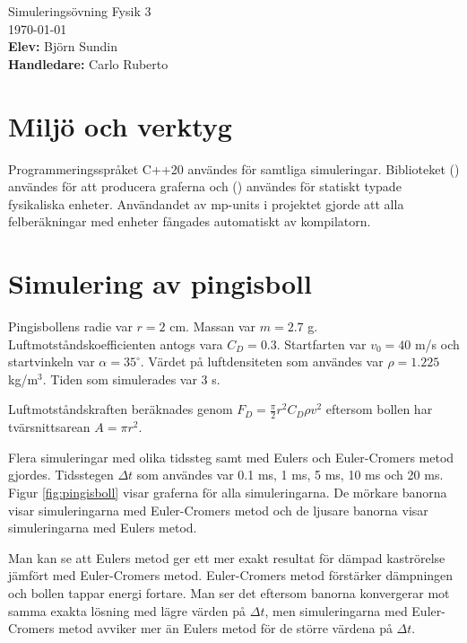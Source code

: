\documentclass[12pt, a4paper]{article}
\begin{document}
\begin{titlepage}
    \begin{center}
        \Huge{Simuleringsövning Fysik 3}\bigskip \\
        \LARGE \today\vspace{1cm}\\
        \large {}
        \textbf{Elev:} Björn Sundin\\
        \textbf{Handledare:} Carlo Ruberto
    \end{center}
\end{titlepage}

\section{Miljö och verktyg}
Programmeringsspråket C++20 användes för samtliga simuleringar. Biblioteket  (\cite{matplotplusplus}) användes för att producera graferna och  (\cite{mp-units}) användes för statiskt typade fysikaliska enheter. Användandet av mp-units i projektet gjorde att alla felberäkningar med enheter fångades automatiskt av kompilatorn.

\section{Simulering av pingisboll}
Pingisbollens radie var $r=2$ cm. Massan var $m=2.7$ g. Luftmotstånds\-koefficienten antogs vara $C_D=0.3$. Startfarten var $v_0=40$ m/s och startvinkeln var $\alpha=35^\circ$. Värdet på luftdensiteten som användes var $\rho=1.225$ kg/m$^3$. Tiden som simulerades var 3 s.

Luftmotståndskraften beräknades genom $F_D=\frac{\pi}{2}r^2C_D\rho v^2$ eftersom bollen har tvärsnittsarean $A=\pi r^2$.

Flera simuleringar med olika tidssteg samt med Eulers och Euler-Cromers metod gjordes. Tidsstegen $\Delta t$ som användes var 0.1 ms, 1 ms, 5 ms, 10 ms och 20 ms. Figur \ref{fig:pingisboll} visar graferna för alla simuleringarna. De mörkare banorna visar simuleringarna med Euler-Cromers metod och de ljusare banorna visar simuleringarna med Eulers metod.

Man kan se att Eulers metod ger ett mer exakt resultat för dämpad kaströrelse jämfört med Euler-Cromers metod. Euler-Cromers metod förstärker dämpn\-ingen och bollen tappar energi fortare. Man ser det eftersom banorna konvergerar mot samma exakta lösning med lägre värden på $\Delta t$, men simuleringarna med Euler-Cromers metod avviker mer än Eulers metod för de större värdena på $\Delta t$.
\end{document}
